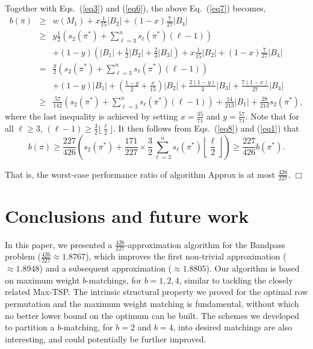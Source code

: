 \documentclass[11pt,twoside]{article}\usepackage{amssymb,latexsym,graphicx,hyperref}\usepackage{epstopdf}
\newenvironment{proof}{{\sc Proof. }}{\hfill$\Box$\vspace{0.2in}}
\begin{document}
\begin{proof}
Together with Eqs.~(\ref{eq3}) and (\ref{eq6}), the above Eq.~(\ref{eq7}) becomes,
\begin{eqnarray}
\label{eq8}
b(\pi)	&\ge	&w(M_1) + x \frac 1{15} |B_2| + (1-x) \frac 7{27} |B_4|\nonumber\\
		&\ge	&y \frac 12 \left(s_2(\pi^*) + \sum_{\ell = 3}^n s_\ell(\pi^*) (\ell - 1)\right)\nonumber\\
		&		&	+ (1-y) \left(|B_1| + \frac 12 |B_2| + \frac 23 |B_3|\right)
					+ x \frac 1{15} |B_2| + (1-x) \frac 7{27} |B_4|\nonumber\\
		&=		&\frac y2 \left(s_2(\pi^*) + \sum_{\ell = 3}^n s_\ell(\pi^*) (\ell - 1)\right)\nonumber\\
		&		& + (1-y) |B_1| + \left(\frac {1-y}2 + \frac x{15}\right) |B_2| + \frac {2(1-y)}3 |B_3| + \frac {7(1-x)}{27} |B_4|\nonumber\\
		&\ge	&\frac {57}{142} \left(s_2(\pi^*) + \sum_{\ell = 3}^n s_\ell(\pi^*) (\ell - 1)\right)
				    + \frac {14}{213} |B_1| + \frac {28}{213} s_2(\pi^*),
\end{eqnarray}
where the last inequality is achieved by setting $x = \frac {35}{71}$ and $y = \frac {57}{71}$.
Note that for all $\ell \ge 3$, $(\ell - 1) \ge \frac 32 \lfloor\frac {\ell}2\rfloor$.
It then follows from Eqs.~(\ref{eq8}) and (\ref{eq1}) that
\begin{equation}
\label{eq9}
b(\pi) \ge \frac {227}{426} \left(s_2(\pi^*) + \frac {171}{227} \times \frac 32 \sum_{\ell = 3}^n s_\ell(\pi^*) \left\lfloor\frac {\ell}2\right\rfloor\right)
	\ge \frac {227}{426} b(\pi^*).
\end{equation}

That is, the worst-case performance ratio of algorithm {\sc Approx} is at most $\frac {426}{227}$.
\end{proof}


\section{Conclusions and future work}
In this paper, we presented a $\frac {426}{227}$-approximation algorithm for the Bandpass problem ($\frac {426}{227} \approx 1.8767$),
which improves the first non-trivial approximation ($\approx 1.8948$) and a subsequent approximation ($\approx 1.8805$).
Our algorithm is based on maximum weight $b$-matchings, for $b = 1, 2, 4$, similar to tackling the closely related Max-TSP.
The intrinsic structural property we proved for the optimal row permutation and the maximum weight matching is fundamental,
without which no better lower bound on the optimum can be built.
The schemes we developed to partition a $b$-matching, for $b = 2$ and $b = 4$, into desired matchings are also interesting,
and could potentially be further improved.
\end{document}
